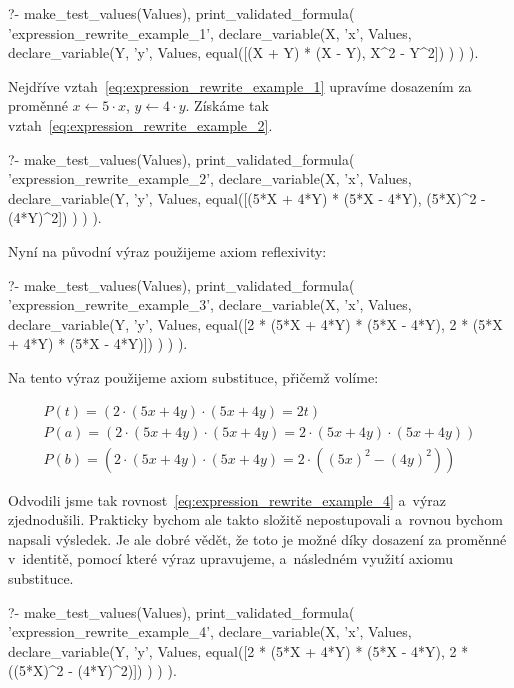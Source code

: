 \begin{prolog}
?- 	make_test_values(Values),
	print_validated_formula(
		'expression_rewrite_example_1',
		declare_variable(X, 'x', Values,
			declare_variable(Y, 'y', Values,
				equal([(X + Y) * (X - Y), X^2 - Y^2])
			)
		)
	).
\end{prolog}

Nejdříve vztah~\ref{eq:expression_rewrite_example_1} upravíme dosazením za proměnné \(x \leftarrow 5 \cdot x\), \(y \leftarrow 4 \cdot y\). Získáme tak vztah~\eqref{eq:expression_rewrite_example_2}.

\begin{prolog}
?- 	make_test_values(Values),
	print_validated_formula(
		'expression_rewrite_example_2',
		declare_variable(X, 'x', Values,
			declare_variable(Y, 'y', Values,
				equal([(5*X + 4*Y) * (5*X - 4*Y), (5*X)^2 - (4*Y)^2])
			)
		)
	).
\end{prolog}

Nyní na původní výraz použijeme axiom reflexivity:

\begin{prolog}
?- 	make_test_values(Values),
	print_validated_formula(
		'expression_rewrite_example_3',
		declare_variable(X, 'x', Values,
			declare_variable(Y, 'y', Values,
				equal([2 * (5*X + 4*Y) * (5*X - 4*Y), 2 * (5*X + 4*Y) * (5*X - 4*Y)])
			)
		)
	).
\end{prolog}

Na tento výraz použijeme axiom substituce, přičemž volíme:

\begin{equation}
\begin{split}
P(t) = (2 \cdot (5 x + 4 y) \cdot (5 x + 4 y) = 2 t) \\
P(a) = (2 \cdot (5 x + 4 y) \cdot (5 x + 4 y) = 2 \cdot (5 x + 4 y) \cdot (5 x + 4 y)) \\
P(b) = (2 \cdot (5 x + 4 y) \cdot (5 x + 4 y) = 2 \cdot ((5 x)^2 - (4 y)^2))
\end{split}
\end{equation}

Odvodili jsme tak rovnost~\eqref{eq:expression_rewrite_example_4} a~výraz zjednodušili. Prakticky bychom ale takto složitě nepostupovali a~rovnou bychom napsali výsledek. Je ale dobré vědět, že toto je možné díky dosazení za proměnné v~identitě, pomocí které výraz upravujeme, a~následném využití axiomu substituce.

\begin{prolog}
?- 	make_test_values(Values),
	print_validated_formula(
		'expression_rewrite_example_4',
		declare_variable(X, 'x', Values,
			declare_variable(Y, 'y', Values,
				equal([2 * (5*X + 4*Y) * (5*X - 4*Y), 2 * ((5*X)^2 - (4*Y)^2)])
			)
		)
	).
\end{prolog}

